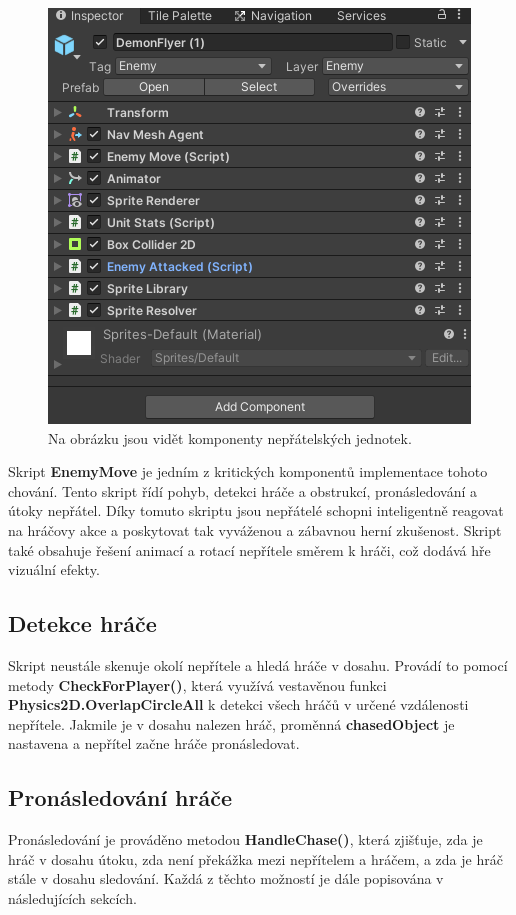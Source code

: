 \begin{figure}[H]
	\centering
	\includegraphics[scale=1]{obrazky-figures/EnemyComponents.png}
	\caption{Na obrázku jsou vidět komponenty nepřátelských jednotek.}
	\label{EnemyScripts}
\end{figure}

Skript \textbf{EnemyMove} je jedním z kritických komponentů implementace tohoto chování. Tento skript řídí pohyb, detekci hráče a obstrukcí, pronásledování a útoky nepřátel. Díky tomuto skriptu jsou nepřátelé schopni inteligentně reagovat na hráčovy akce a poskytovat tak vyváženou a zábavnou herní zkušenost. Skript také obsahuje řešení animací a rotací nepřítele směrem k hráči, což dodává hře vizuální efekty.

\subsection{Detekce hráče}
Skript neustále skenuje okolí nepřítele a hledá hráče v dosahu. Provádí to pomocí metody \textbf{CheckForPlayer()}, která využívá vestavěnou funkci \textbf{Physics2D.OverlapCircleAll} k detekci všech hráčů v určené vzdálenosti nepřítele. Jakmile je v dosahu nalezen hráč, proměnná \textbf{chasedObject} je nastavena a nepřítel začne hráče pronásledovat.

\subsection{Pronásledování hráče}
Pronásledování je prováděno metodou \textbf{HandleChase()}, která zjišťuje, zda je hráč v dosahu útoku, zda není překážka mezi nepřítelem a hráčem, a zda je hráč stále v dosahu sledování. Každá z těchto možností je dále popisována v následujících sekcích.

